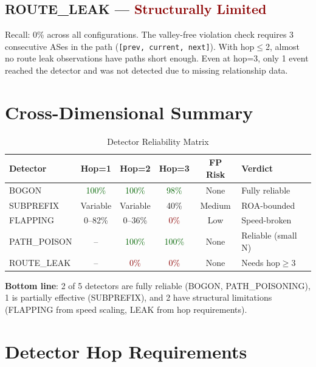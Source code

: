 \documentclass[11pt,a4paper]{article}
\begin{document}
\subsection{ROUTE\_LEAK --- \textcolor{darkred}{Structurally Limited}}

Recall: 0\% across all configurations. The valley-free violation check requires
3 consecutive ASes in the path (\texttt{[prev, current, next]}). With hop$\leq$2,
almost no route leak observations have paths short enough. Even at hop=3, only
1 event reached the detector and was not detected due to missing relationship data.

\section{Cross-Dimensional Summary}

\begin{table}[H]
\centering
\caption{Detector Reliability Matrix}
\begin{tabularx}{\textwidth}{lccccX}
\toprule
\textbf{Detector} & \textbf{Hop=1} & \textbf{Hop=2} & \textbf{Hop=3} & \textbf{FP Risk} & \textbf{Verdict} \\
\midrule
BOGON           & \textcolor{darkgreen}{100\%} & \textcolor{darkgreen}{100\%} & \textcolor{darkgreen}{98\%} & None & Fully reliable \\
SUBPREFIX       & Variable & Variable & 40\% & Medium & ROA-bounded \\
FLAPPING        & 0--82\% & 0--36\% & \textcolor{darkred}{0\%} & Low & Speed-broken \\
PATH\_POISON    & -- & \textcolor{darkgreen}{100\%} & \textcolor{darkgreen}{100\%} & None & Reliable (small N) \\
ROUTE\_LEAK     & -- & \textcolor{darkred}{0\%} & \textcolor{darkred}{0\%} & None & Needs hop$\geq$3 \\
\bottomrule
\end{tabularx}
\end{table}

\textbf{Bottom line}: 2 of 5 detectors are fully reliable (BOGON, PATH\_POISONING),
1 is partially effective (SUBPREFIX), and 2 have structural limitations
(FLAPPING from speed scaling, LEAK from hop requirements).

\section{Detector Hop Requirements}
\end{document}
